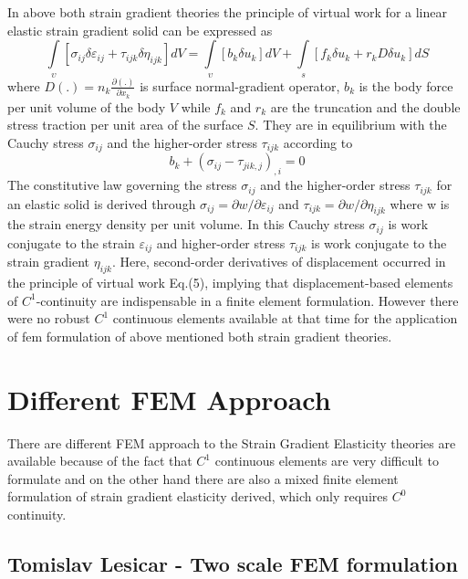 \documentclass[12pt]{article}
\begin{document}
In above both strain gradient theories the principle of virtual work for a linear elastic strain gradient solid can be expressed as
\begin{equation}
\int\limits_\upsilon\! [\sigma_{ij} \delta\varepsilon_{ij} + \tau_{ijk}\delta\eta_{ijk}]  dV = \int\limits_\upsilon\! [b_k\delta u_k] dV + \int\limits_s \! [f_k\delta u_k+r_kD\delta u_k]dS
\end{equation}
where $D(.) = n_k\frac{\partial(.)}{\partial x_k}$ is surface normal-gradient operator, $b_k$ is the body force per unit volume
of the body $V$ while $f_k$ and $r_k$ are the truncation and the double stress traction per unit area of the surface $S$. They are in equilibrium with the Cauchy stress $\sigma_{ij}$ and the higher-order stress $\tau_{ijk}$ according to
\begin{equation}
b_k + (\sigma_{ij}-\tau_{jik,j})_{,i} = 0
\end{equation}
The constitutive law governing the stress $\sigma_{ij}$ and the higher-order stress $\tau_{ijk}$ for an elastic solid is derived through $\sigma_{ij} = \partial w / \partial \varepsilon_{ij}$ and $\tau_{ijk}= \partial w / \partial \eta_{ijk}$ where w is the strain energy density per unit volume. In this Cauchy stress $\sigma_{ij}$ is work conjugate to the strain $\varepsilon_{ij}$ and higher-order stress $\tau_{ijk}$ is work conjugate to the strain gradient  $\eta_{ijk}$.
\newline
\newline
Here, second-order derivatives of displacement occurred in the principle of virtual work Eq.(5), implying that displacement-based elements of $C^1$-continuity are indispensable in a finite element formulation. However there were no robust $C^1$ continuous elements available at that time for the application of fem formulation of above mentioned both strain gradient theories.

\section{Different FEM Approach}
There are different FEM approach to the Strain Gradient Elasticity theories are available because of the fact that $C^1$ continuous elements are very difficult to formulate and on the other hand there are also a mixed finite element formulation of strain gradient elasticity derived, which only requires $C^0$ continuity.

\subsection{Tomislav Lesicar - Two scale FEM formulation} 
\end{document}
